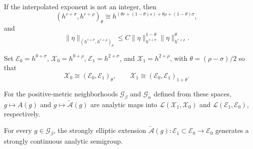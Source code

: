 \begin{lemma}
\label{lem:chow-iv-holder-interpolation}

If the interpolated exponent is not an integer, then
\begin{equation*}
 (h^{s+\sigma},h^{r+\rho})_\theta\cong
 h^{(\theta r+(1-\theta)s)+\theta\rho+(1-\theta)\sigma},
 \tag{35.15}
\end{equation*}
and
\begin{equation*}
 \|\eta\|_{(h^{s+\sigma},h^{r+\rho})_\theta}
 \le C\|\eta\|_{h^{s+\sigma}}^{1-\theta}
 \|\eta\|_{h^{r+\rho}}^\theta.
 \tag{35.16}
\end{equation*}
\end{lemma}

Set $\mathcal E_0=h^{0+\sigma}$, $\mathcal X_0=h^{0+\rho}$,
$\mathcal E_1=h^{2+\sigma}$, and $\mathcal X_1=h^{2+\rho}$, with
$\theta=(\rho-\sigma)/2$ so that
\begin{equation*}
 \mathcal X_0\cong(\mathcal E_0,\mathcal E_1)_\theta,
 \qquad \mathcal X_1\cong(\mathcal E_0,\mathcal E_1)_{1+\theta}.
 \tag{35.18}
\end{equation*}

\begin{lemma}
\label{lem:chow-iv-deturck-analytic-dependence}

For the positive-metric neighborhoods $\mathcal G_\beta$ and $\mathcal G_\alpha$
defined from these spaces, $g\mapsto A(g)$ and
$g\mapsto\widetilde{\mathcal A}(g)$ are analytic maps into
$\mathcal L(\mathcal X_1,\mathcal X_0)$ and
$\mathcal L(\mathcal E_1,\mathcal E_0)$, respectively.
\end{lemma}

\begin{lemma}
\label{lem:chow-iv-deturck-analytic-semigroup}


For every $g\in\mathcal G_\beta$, the strongly elliptic extension
$\widetilde{\mathcal A}(g):\mathcal E_1\subset\mathcal E_0\to\mathcal E_0$
generates a strongly continuous analytic semigroup.
\end{lemma}

